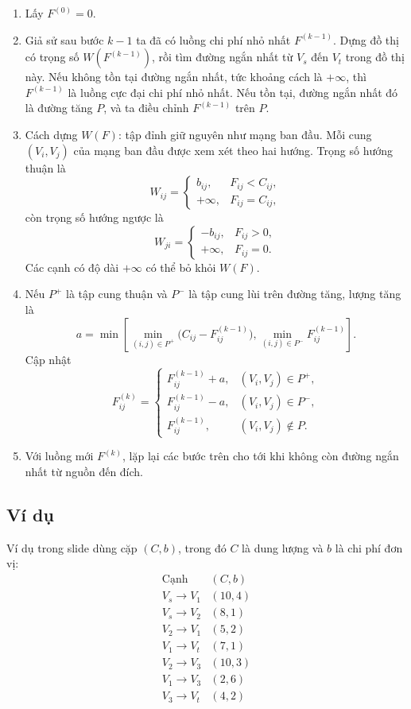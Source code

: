 \documentclass[11pt]{article}
\begin{document}
\begin{enumerate}
  \item Lấy $F^{(0)}=0$.
  \item Giả sử sau bước $k-1$ ta đã có luồng chi phí nhỏ nhất $F^{(k-1)}$.
  Dựng đồ thị có trọng số $W(F^{(k-1)})$, rồi tìm đường ngắn nhất từ $V_s$ đến
  $V_t$ trong đồ thị này. Nếu không tồn tại đường ngắn nhất, tức khoảng cách
  là $+\infty$, thì $F^{(k-1)}$ là luồng cực đại chi phí nhỏ nhất. Nếu tồn tại,
  đường ngắn nhất đó là đường tăng $P$, và ta điều chỉnh $F^{(k-1)}$ trên $P$.
  \item Cách dựng $W(F)$: tập đỉnh giữ nguyên như mạng ban đầu. Mỗi cung
  $(V_i,V_j)$ của mạng ban đầu được xem xét theo hai hướng. Trọng số hướng
  thuận là
  \[
    W_{ij}=
    \begin{cases}
      b_{ij}, & F_{ij}<C_{ij},\\
      +\infty, & F_{ij}=C_{ij},
    \end{cases}
  \]
  còn trọng số hướng ngược là
  \[
    W_{ji}=
    \begin{cases}
      -b_{ij}, & F_{ij}>0,\\
      +\infty, & F_{ij}=0.
    \end{cases}
  \]
  Các cạnh có độ dài $+\infty$ có thể bỏ khỏi $W(F)$.
  \item Nếu $P^+$ là tập cung thuận và $P^-$ là tập cung lùi trên đường tăng,
  lượng tăng là
  \[
    a=\min\left[
      \min_{(i,j)\in P^+}\bigl(C_{ij}-F_{ij}^{(k-1)}\bigr),
      \min_{(i,j)\in P^-}F_{ij}^{(k-1)}
    \right].
  \]
  Cập nhật
  \[
    F_{ij}^{(k)}=
    \begin{cases}
      F_{ij}^{(k-1)}+a, & (V_i,V_j)\in P^+,\\
      F_{ij}^{(k-1)}-a, & (V_i,V_j)\in P^-,\\
      F_{ij}^{(k-1)}, & (V_i,V_j)\notin P.
    \end{cases}
  \]
  \item Với luồng mới $F^{(k)}$, lặp lại các bước trên cho tới khi không còn
  đường ngắn nhất từ nguồn đến đích.
\end{enumerate}

\subsection{Ví dụ}

Ví dụ trong slide dùng cặp $(C,b)$, trong đó $C$ là dung lượng và $b$ là chi
phí đơn vị:
\[
\begin{array}{c|c}
\text{Cạnh} & (C,b)\\ \hline
V_s\to V_1 & (10,4)\\
V_s\to V_2 & (8,1)\\
V_2\to V_1 & (5,2)\\
V_1\to V_t & (7,1)\\
V_2\to V_3 & (10,3)\\
V_1\to V_3 & (2,6)\\
V_3\to V_t & (4,2)
\end{array}
\]
\end{document}
